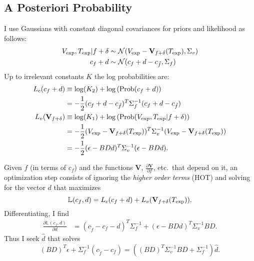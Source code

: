 \documentclass[12pt]{article}
\newcommand{\normal}[2]{{\cal N}(#1,#2)}
\newcommand{\normalexp}[3]{ -\frac{1}{2}
      (#1 - #2)^T #3^{-1} (#1 - #2) }
\newcommand{\fnom}{\tilde f}
\newcommand{\Prob}{\text{Prob}}
\newcommand{\partiald}[2]{\frac{\partial #1}{\partial #2}}
\newcommand\Vt{\mathbf{V}}
\newcommand\vexp{V_{\rm{exp}}}
\newcommand\texp{T_{\rm{exp}}}
\newcommand\cf{c_f}
\newcommand\DVDf{\partiald{\Vt}{f}}
\newcommand\Lbb{\mathbb{L}}
\begin{document}
\subsection{A Posteriori Probability}
\label{sec:app}

I use Gaussians with constant diagonal covariances for priors and
likelihood as follows:
\begin{align}
\vexp,\texp | f+\delta &\sim
\normal{\vexp-\Vt_{f+\delta}(\texp)}{\Sigma_v} \\
\cf+d &\sim \normal{\cf+d - c_{\fnom}}{\Sigma_f}
\end{align}
Up to irrelevant constants $K$ the log probabilities are:
\begin{align}
  L_c(\cf+d) & \equiv \log(K_2) + \log \left(\Prob(\cf+d) \right)\\
  & = \normalexp{\cf+d}{c_{\fnom}}{\Sigma_f}\\
  L_v(\Vt_{f+\delta}) & \equiv \log(K_1) + \log
  \left(\Prob(\vexp,\texp | f+\delta) \right)
  \nonumber \\
  & = \normalexp{\vexp}{\Vt_{f+\delta}(\texp)}{\Sigma_v} \\
  &= \normalexp{\epsilon}{BDd}{\Sigma_v}.
\end{align}

Given $f$ (in terms of $\cf$) and the functions $\Vt$, $\DVDf$, etc.\
that depend on it, an optimization step consists of ignoring the
\emph{higher order terms} (HOT) and solving for the vector $d$ that
maximizes
\begin{equation}
  \label{eq:L}
  \Lbb(\cf,d) = L_c(\cf + d) + L_v(\Vt_{f+\delta}(\texp)).
\end{equation}
Differentiating, I find
\begin{align*}
  \partiald{\Lbb(\cf,d)}{d} &= (c_{\fnom} - \cf - d)^T
  \Sigma^{-1}_f + (\epsilon - BDd)^T \Sigma_v^{-1}BD.
\end{align*}
Thus I seek $\hat d$ that solves
\begin{equation}
  \label{eq:dmap}
  (BD)^T\epsilon + \Sigma_f^{-1} (c_{\tilde f} - \cf) = 
  \left((BD)^T\Sigma_v^{-1}BD + \Sigma_f^{-1} \right) \hat d.
\end{equation}
\end{document}
